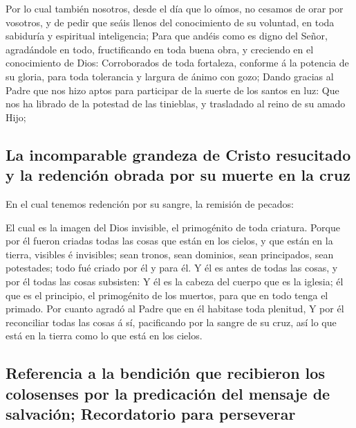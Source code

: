  Por lo cual también nosotros, desde el día que lo oímos,
no cesamos de orar por vosotros, y de pedir que seáis llenos del
conocimiento de su voluntad, en toda sabiduría y espiritual
inteligencia;  Para que andéis como es digno del Señor,
agradándole en todo, fructificando en toda buena obra, y creciendo en el
conocimiento de Dios:  Corroborados de toda fortaleza,
conforme á la potencia de su gloria, para toda tolerancia y largura de
ánimo con gozo;  Dando gracias al Padre que nos hizo
aptos para participar de la suerte de los santos en luz: 
Que nos ha librado de la potestad de las tinieblas, y trasladado al
reino de su amado Hijo;

\hypertarget{la-incomparable-grandeza-de-cristo-resucitado-y-la-redenciuxf3n-obrada-por-su-muerte-en-la-cruz}{%
\subsection{La incomparable grandeza de Cristo resucitado y la redención
obrada por su muerte en la
cruz}\label{la-incomparable-grandeza-de-cristo-resucitado-y-la-redenciuxf3n-obrada-por-su-muerte-en-la-cruz}}

 En el cual tenemos redención por su sangre, la remisión
de pecados:

 El cual es la imagen del Dios invisible, el primogénito
de toda criatura.  Porque por él fueron criadas todas las
cosas que están en los cielos, y que están en la tierra, visibles é
invisibles; sean tronos, sean dominios, sean principados, sean
potestades; todo fué criado por él y para él.  Y él es
antes de todas las cosas, y por él todas las cosas subsisten:
 Y él es la cabeza del cuerpo que es la iglesia; él que
es el principio, el primogénito de los muertos, para que en todo tenga
el primado.  Por cuanto agradó al Padre que en él
habitase toda plenitud,  Y por él reconciliar todas las
cosas á sí, pacificando por la sangre de su cruz, así lo que está en la
tierra como lo que está en los cielos.

\hypertarget{referencia-a-la-bendiciuxf3n-que-recibieron-los-colosenses-por-la-predicaciuxf3n-del-mensaje-de-salvaciuxf3n-recordatorio-para-perseverar}{%
\subsection{Referencia a la bendición que recibieron los colosenses por
la predicación del mensaje de salvación; Recordatorio para
perseverar}\label{referencia-a-la-bendiciuxf3n-que-recibieron-los-colosenses-por-la-predicaciuxf3n-del-mensaje-de-salvaciuxf3n-recordatorio-para-perseverar}}

